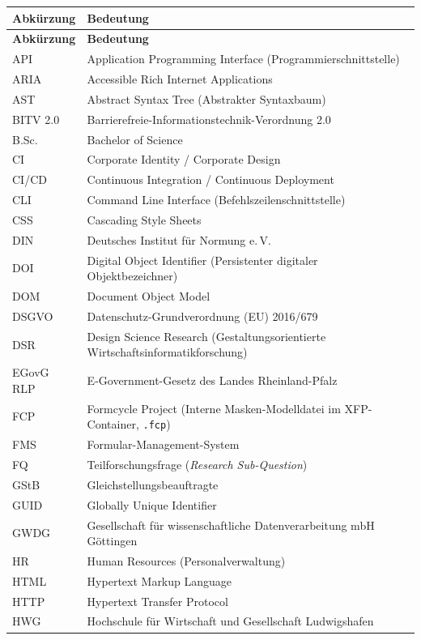 \documentclass[
    12pt,
    a4paper,
    ngerman,
    oneside,
    parskip=half,
    listof=totoc,
    bibliography=totoc
]{scrreprt}
\begin{document}
\begin{xltabular}{\textwidth}{p{3.2cm}X}
\toprule
\textbf{Abkürzung} & \textbf{Bedeutung} \\
\midrule
\endfirsthead
\toprule
\textbf{Abkürzung} & \textbf{Bedeutung} \\
\midrule
\endhead
\bottomrule
\endfoot
\bottomrule
\endlastfoot
API & Application Programming Interface (Programmierschnittstelle) \\
ARIA & Accessible Rich Internet Applications \\
AST & Abstract Syntax Tree (Abstrakter Syntaxbaum) \\
BITV 2.0 & Barrierefreie-Informationstechnik-Verordnung 2.0 \\
B.Sc. & Bachelor of Science \\
CI & Corporate Identity / Corporate Design \\
CI/CD & Continuous Integration / Continuous Deployment \\
CLI & Command Line Interface (Befehlszeilenschnittstelle) \\
CSS & Cascading Style Sheets \\
DIN & Deutsches Institut für Normung e.\,V. \\
DOI & Digital Object Identifier (Persistenter digitaler Objektbezeichner) \\
DOM & Document Object Model \\
DSGVO & Datenschutz-Grundverordnung (EU) 2016/679 \\
DSR & Design Science Research (Gestaltungsorientierte Wirtschaftsinformatikforschung) \\
EGovG RLP & E-Government-Gesetz des Landes Rheinland-Pfalz \\
FCP & Formcycle Project (Interne Masken-Modelldatei im XFP-Container, \texttt{.fcp}) \\
FMS & Formular-Management-System \\
FQ & Teilforschungsfrage (\textit{Research Sub-Question}) \\
GStB & Gleichstellungsbeauftragte \\
GUID & Globally Unique Identifier \\
GWDG & Gesellschaft für wissenschaftliche Datenverarbeitung mbH Göttingen \\
HR & Human Resources (Personalverwaltung) \\
HTML & Hypertext Markup Language \\
HTTP & Hypertext Transfer Protocol \\
HWG & Hochschule für Wirtschaft und Gesellschaft Ludwigshafen \\

\end{xltabular}
\end{document}
